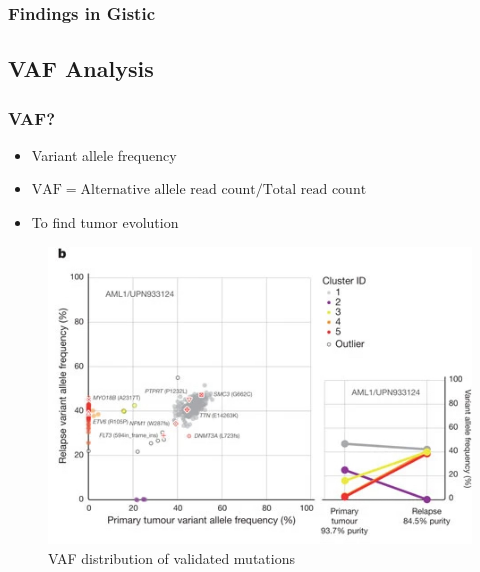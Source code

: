 \documentclass{beamer}
\begin{document}
    \begin{frame}
        \frametitle{Findings in Gistic}
    \end{frame}

    \subsection{VAF Analysis}
    \begin{frame}
        \frametitle{VAF?}

        \begin{itemize}
            \item Variant allele frequency
            \item $\textrm{VAF} = \textrm{Alternative allele read count} / \textrm{Total read count}$
            \item To find tumor evolution
        \end{itemize}

        \begin{figure}
            \includegraphics[width=0.4 \linewidth]{figures/VAF/VAF.jpg}
            \caption{VAF distribution of validated mutations \protect\cite{VAF1}}
        \end{figure}
    \end{frame}
\end{document}
